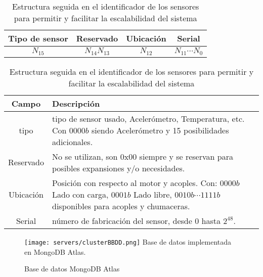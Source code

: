     \begin{table}[ht]
        \begin{center}
        \caption[Estructura IdSensor]{Estructura seguida en el identificador de
        los sensores para permitir y facilitar la escalabilidad del sistema}
        \label{tab:CodIdSensor}

            \vspace{0.3cm}
            \begin{tabular}{|c|c|c|c|}
                \hline
                Tipo de sensor & Reservado& Ubicación   & Serial \\\hline\hline
                $ N_{15} $ & $ N_{14}N_{13} $ &$ N_{12} $  &  $ N_{11}\cdots N_{0} $\\
                \hline
            \end{tabular}

            \vspace{0.3cm}
            \begin{tabular}{|c|p{13cm}|}
                \hline
                Campo       & Descripción
                \\\hline\hline
                tipo        & tipo de sensor usado, Acelerómetro, Temperatura, etc.
                Con $0000b$ siendo Acelerómetro y 15 posibilidades adicionales.
                \\\hline
                Reservado   & No se utilizan, son 0x00 siempre y se reservan para
                posibles expansiones y/o necesidades.
                \\\hline
                Ubicación   & Posición con respecto al motor y acoples. Con:
                $0000b$ Lado con carga, $ 0001b$ Lado libre, $ 0010b\cdots1111b $
                disponibles para acoples y chumaceras.
                \\\hline
                Serial      & número de fabricación del sensor, desde 0 hasta $2^{48}$.
                \\\hline
            \end{tabular}
        \end{center}
    \end{table}

	\begin{figure}[htb]
		\centering
        \caption{Base de datos MongoDB Atlas}
        \texttt{[image: servers/clusterBBDD.png]}
        Base de datos implementada en MongoDB Atlas.    \label{img:clusterBBDD}
	\end{figure}

